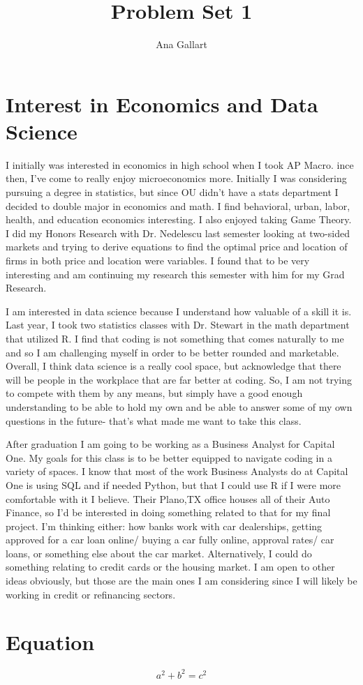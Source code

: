 \documentclass{article}
\title{Problem Set 1}
\author{Ana Gallart}
\begin{document}
\maketitle

\section{Interest in Economics and Data Science}

I initially was interested in economics in high school when I took AP Macro. ince then, I've come to really enjoy microeconomics more. Initially I was considering pursuing a degree in statistics, but since OU didn't have a stats department I decided to double major in economics and math. I find behavioral, urban, labor, health, and education economics interesting. I also enjoyed taking Game Theory. I did my Honors Research with Dr. Nedelescu last semester looking at two-sided markets and trying to derive equations to find the optimal price and location of firms in both price and location were variables. I found that to be very interesting and am continuing my research this semester with him for my Grad Research. 

I am interested in data science because I understand how valuable of a skill it is. Last year, I took two statistics classes with Dr. Stewart in the math department that utilized R. I find that coding is not something that comes naturally to me and so I am challenging myself in order to be better rounded and marketable. Overall, I think data science is a really cool space, but acknowledge that there will be people in the workplace that are far better at coding. So, I am not trying to compete with them by any means, but simply have a good enough understanding to be able to hold my own and be able to answer some of my own questions in the future- that's what made me want to take this class. 

After graduation I am going to be working as a Business Analyst for Capital One. My goals for this class is to be better equipped to navigate coding in a variety of spaces. I know that most of the work Business Analysts do at Capital One is using SQL and if needed Python, but that I could use R if I were more comfortable with it I believe. Their Plano,TX office houses all of their Auto Finance, so I'd be interested in doing something related to that for my final project. I'm thinking either: how banks work with car dealerships, getting approved for a car loan online/ buying a car fully online, approval rates/ car loans, or something else about the car market. Alternatively, I could do something relating to credit cards or the housing market. I am open to other ideas obviously, but those are the main ones I am considering since I will likely be working in credit or refinancing sectors. 


\section{Equation}

$$a^2 +b^2 = c^2$$
\end{document}

